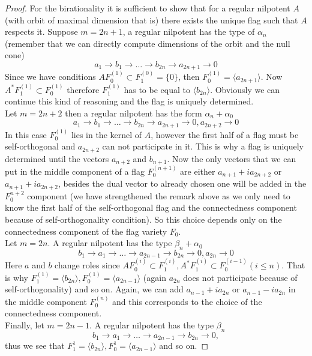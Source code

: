 \documentclass[12pt]{amsart}
\theoremstyle{definition}
\theoremstyle{remark}
\numberwithin{equation}{subsection}
\begin{document}
\begin{proof} For the birationality it is sufficient to show that for a regular nilpotent $A$ (with orbit of maximal dimension that is) there exists the unique flag such that $A$ respects it. Suppose $m=2n+1$, a regular nilpotent has the type of $\alpha_n$ (remember that we can directly compute dimensions of the orbit and the null cone)
\begin{equation}
    a_1\rightarrow b_1 \rightarrow \dots \rightarrow b_{2n} \rightarrow a_{2n+1} \rightarrow 0
\end{equation}
Since we have conditions $AF_0^{(1)}\subset F_1^{(0)}=\{0\}$, then $F_0^{(1)} = \langle a_{2n+1} \rangle$. Now $A^*F_1^{(1)}\subset F_0^{(1)}$ therefore $F_1^{(1)}$ has to be equal to $\langle b_{2n}\rangle$. Obviously we can continue this kind of reasoning and the flag is uniquely determined.\\
Let $m=2n+2$ then a regular nilpotent has the form $\alpha_n + \alpha_0$
\begin{equation}
    a_1\rightarrow b_1 \rightarrow \dots \rightarrow b_{2n} \rightarrow a_{2n+1} \rightarrow 0,  a_{2n+2} \rightarrow 0
\end{equation}
In this case $F_0^{(1)}$ lies in the kernel of $A$, however the first half of a flag must be self-orthogonal and $a_{2n+2}$ can not participate in it. This is why a flag is uniquely determined until the vectors $a_{n+2}$ and $b_{n+1}$. Now the only vectors that we can put in the middle component of a flag $F_0^{(n+1)}$ are either $a_{n+1}+ia_{2n+2}$ or $a_{n+1}+ia_{2n+2}$, besides the dual vector to already chosen one will be added in the $F_0^{n+2}$ component (we have strengthened the remark above as we only need to know the first half of the self-orthogonal flag and the connectedness component because of self-orthogonality condition). So this choice depends only on the connectedness component of the flag variety $F_0$.\\
Let $m=2n$. A regular nilpotent has the type $\beta_n + \alpha_0$
\begin{equation}
    b_1 \rightarrow a_1 \rightarrow \dots \rightarrow a_{2n-1} \rightarrow b_{2n} \rightarrow 0, a_{2n} \rightarrow 0
\end{equation}
Here $a$ and $b$ change roles since $AF_0^{(i)} \subset F_1^{(i)},A^*F_1^{(i)} \subset F_0^{(i-1)}(i\le n)$. That is why $F_1^{(1)}=\langle b_{2n}\rangle, F_0^{(1)}=\langle a_{2n-1}\rangle$ (again $a_{2n}$ does not participate because of self-orthogonality) and so on. Again, we can add $a_{n-1}+ia_{2n}$ or $a_{n-1}-ia_{2n}$ in the middle component $F_0^{(n)}$ and this corresponds to the choice of the connectedness component.\\
Finally, let $m=2n-1$. A regular nilpotent has the type $\beta_n$
\begin{equation}
    b_1 \rightarrow a_1 \rightarrow \dots \rightarrow a_{2n-1} \rightarrow b_{2n} \rightarrow 0,
\end{equation}
thus we see that $F_{1}^{1}= \langle b_{2n}\rangle, F_{0}^{1}=\langle a_{2n-1} \rangle$ and so on.
\end{proof}
\end{document}

